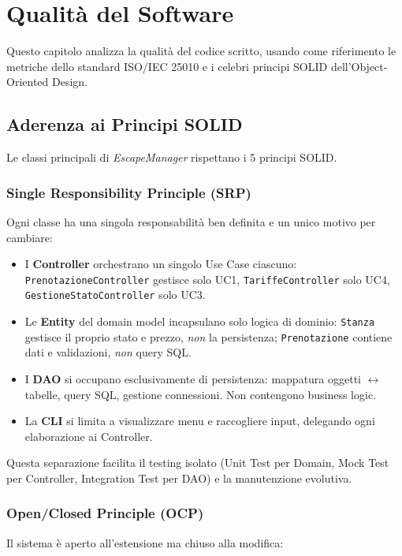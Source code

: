 \chapter{Qualità del Software}

Questo capitolo analizza la qualità del codice scritto, usando come riferimento le metriche dello standard ISO/IEC 25010 e i celebri principi SOLID dell'Object-Oriented Design.

\section{Aderenza ai Principi SOLID}

Le classi principali di \textit{EscapeManager} rispettano i 5 principi SOLID.

\subsection{Single Responsibility Principle (SRP)}
Ogni classe ha una singola responsabilità ben definita e un unico motivo per cambiare:

\begin{itemize}
    \item I \textbf{Controller} orchestrano un singolo Use Case ciascuno: \texttt{PrenotazioneController} gestisce solo UC1, \texttt{TariffeController} solo UC4, \texttt{GestioneStatoController} solo UC3.
    \item Le \textbf{Entity} del domain model incapsulano solo logica di dominio: \texttt{Stanza} gestisce il proprio stato e prezzo, \textit{non} la persistenza; \texttt{Prenotazione} contiene dati e validazioni, \textit{non} query SQL.
    \item I \textbf{DAO} si occupano esclusivamente di persistenza: mappatura oggetti $\leftrightarrow$ tabelle, query SQL, gestione connessioni. Non contengono business logic.
    \item La \textbf{CLI} si limita a visualizzare menu e raccogliere input, delegando ogni elaborazione ai Controller.
\end{itemize}

Questa separazione facilita il testing isolato (Unit Test per Domain, Mock Test per Controller, Integration Test per DAO) e la manutenzione evolutiva.

\subsection{Open/Closed Principle (OCP)}
Il sistema è aperto all'estensione ma chiuso alla modifica:

